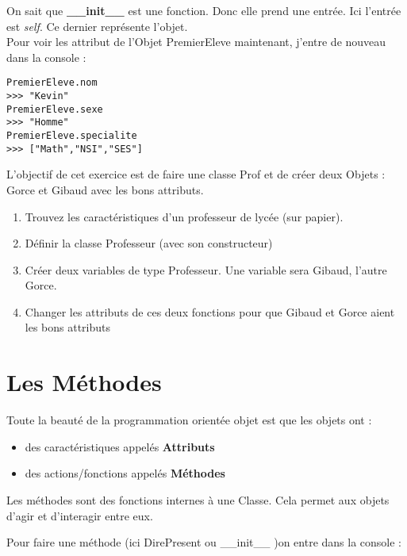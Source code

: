 \documentclass[12pt,fleqn]{report} %
\begin{document}
On sait que \textbf{\_\_init\_\_} est une fonction. Donc elle prend une entrée. Ici l'entrée est \textit{self}. Ce dernier représente l'objet. \\

Pour voir les attribut de l'Objet PremierEleve maintenant, j'entre de nouveau dans la console : 

\begin{center}
	\begin{varwidth}[t]{.5\textwidth}
		\begin{lstlisting}[language=iPython,linewidth = 12cm]
PremierEleve.nom 
>>> "Kevin"  
PremierEleve.sexe
>>> "Homme"
PremierEleve.specialite
>>> ["Math","NSI","SES"]\end{lstlisting}
\end{varwidth}\end{center}


\begin{exercise}
	L'objectif de cet exercice est de faire une classe Prof et de créer deux Objets : Gorce et Gibaud avec les bons attributs.
	\begin{enumerate}
		\item Trouvez les caractéristiques d'un professeur de lycée (sur papier).
		\item Définir la classe Professeur (avec son constructeur)
		\item Créer deux variables de type Professeur. Une variable sera Gibaud, l'autre Gorce.
		\item Changer les attributs de ces deux fonctions pour que Gibaud et Gorce aient les bons attributs
	\end{enumerate}
\end{exercise}

\section{Les Méthodes}

Toute la beauté de la programmation orientée objet est que les objets ont : 
\begin{itemize}
	\item des caractéristiques appelés \textbf{Attributs}
	\item des actions/fonctions appelés \textbf{Méthodes}
\end{itemize}

Les méthodes sont des fonctions internes à une Classe. Cela permet aux objets d'agir et d'interagir entre eux.

Pour faire une méthode (ici DirePresent ou \_\_init\_\_ )on entre dans la console :
\end{document}
